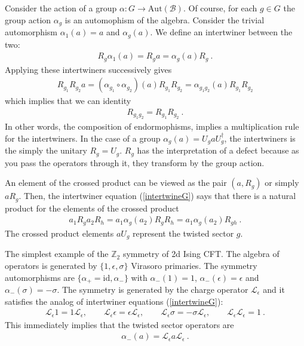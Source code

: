 \documentclass{article}
\newcommand{\mB}{\mathcal{B}}
\newcommand{\mL}{\mathcal{L}}
\newcommand{\ep}{\epsilon}
\theoremstyle{definition}
\begin{document}
  Consider the action of a group $\alpha:G\to \text{Aut}(\mB)$. Of course, for each
  $g\in G$ the group action $\alpha_{g}$ is an automophism of the algebra.
  Consider the trivial automorphism $\alpha_{1}(a)=a$ and $\alpha_{g}(a)$. We define
  an intertwiner between the two:
  \begin{eqnarray}
    \label{intertwineG} R_g \alpha_1(a)=R_g a=\alpha_g(a) R_g\ .
  \end{eqnarray}
  Applying these intertwiners successively gives
  \begin{eqnarray}
    R_{g_1}R_{g_2}a=(\alpha_{g_1}\circ\alpha_{g_2})(a)R_{g_1}R_{g_2}=\alpha_{g_1g_2}(a)R_{g_1}R_{g_2}
  \end{eqnarray}
  which implies that we can identity
  \begin{eqnarray}
    R_{g_1g_2}=R_{g_1}R_{g_2}\ .
  \end{eqnarray}
  In other words, the composition of endormophisms, implies a multiplication
  rule for the intertwiners. In the case of a group $\alpha_{g}(a)=U_{g}a U_{g}^{\dagger}$,
  the intertwiners is the simply the unitary $R_{g}=U_{g}$. $R_{g}$ has the interpretation
  of a defect because as you pass the operators through it, they transform by
  the group action.

  An element of the crossed product can be viewed as the pair $(a,R_{g})$ or
  simply $a R_{g}$. Then, the intertwiner equation (\ref{intertwineG}) says that
  there is a natural product for the elements of the crossed product
  \begin{eqnarray}
    a_1 R_{g} a_2 R_h= a_1 \alpha_g(a_2) R_g R_h= a_1\alpha_g(a_2) R_{gh}\ .
  \end{eqnarray}
  The crossed product elements $a U_{g}$ represent the twisted sector $g$.

  The simplest example of the $\mathbb{Z}_{2}$ symmetry of 2d Ising CFT. The algebra
  of operators is generated by $\{1,\epsilon,\sigma\}$ Virasoro primaries. The
  symmetry automorphisms are $\{\alpha_{+}=\text{id},\alpha_{-}\}$ with
  $\alpha_{-}(1)=1$, $\alpha_{-}(\epsilon)=\epsilon$ and $\alpha_{-}(\sigma)=-\sigma$.
  The symmetry is generated by the charge operator $\mathcal{L}_{\epsilon}$ and
  it satisfies the analog of intertwiner equations (\ref{intertwineG}):
  \begin{eqnarray}
    \mL_\epsilon 1=1\mL_\ep, \qquad \mL_\ep \epsilon=\epsilon \mL_\ep, \qquad
    \mL_\ep\sigma=-\sigma \mL_\ep,\qquad \mL_\ep \mL_\ep=1\ .
  \end{eqnarray}
  This immediately implies that the twisted sector operators are
  \begin{eqnarray}
    \alpha_-(a)=\mL_\ep a \mL_\ep\ .
  \end{eqnarray}
\end{document}
